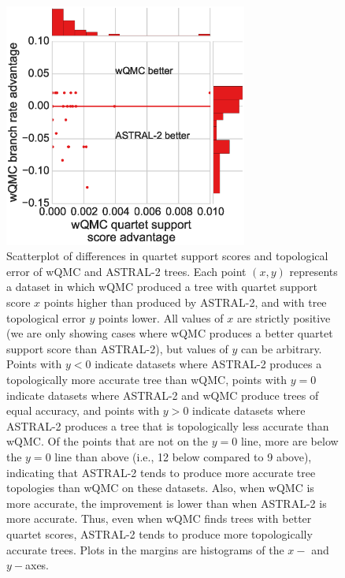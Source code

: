   \begin{figure}[h!]
 \includegraphics[width=8cm]{hgt-figs/quartet-score-comparison.eps}
 \caption[Differences in quartet support scores
and topological error of wQMC and ASTRAL-2  trees]{{Scatterplot of differences in quartet support scores
and topological error of wQMC and ASTRAL-2  trees. } 
Each point $(x,y)$ represents a dataset in which
wQMC produced a tree with quartet support score 
$x$ points higher than produced by ASTRAL-2, and
with tree topological error $y$ points lower. 
All values of $x$ are strictly positive 
(we are only showing cases where wQMC %
produces a better quartet support score %
than ASTRAL-2), but values of $y$ can be arbitrary.
Points with $y < 0$ indicate datasets where ASTRAL-2 produces
a topologically more accurate tree than wQMC, points with $y=0$
indicate datasets where ASTRAL-2 and wQMC produce trees of equal accuracy,
and points with $y>0$ indicate datasets where ASTRAL-2 produces
a tree that is topologically less accurate than wQMC. 
Of the points that are not on the $y=0$ line, more are below
the $y=0$ line than above (i.e., 12 below compared to 9 above), 
indicating that ASTRAL-2 tends to
produce  more accurate tree topologies than wQMC on these datasets.
Also, when wQMC is more accurate, the
improvement is lower than when ASTRAL-2 is more accurate.
Thus, even when wQMC finds trees with better quartet scores, ASTRAL-2
tends to produce more topologically accurate trees.
Plots in the margins are histograms of the $x-$ and $y-$axes.
} 
\label{hgt::fig4}
       \end{figure}



